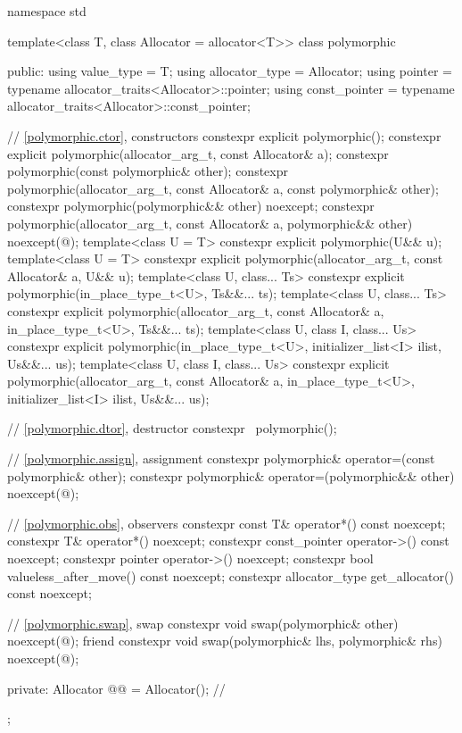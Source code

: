 %
\begin{codeblock}
namespace std {
  template<class T, class Allocator = allocator<T>>
  class polymorphic {
  public:
    using value_type = T;
    using allocator_type = Allocator;
    using pointer = typename allocator_traits<Allocator>::pointer;
    using const_pointer = typename allocator_traits<Allocator>::const_pointer;

    // \ref{polymorphic.ctor}, constructors
    constexpr explicit polymorphic();
    constexpr explicit polymorphic(allocator_arg_t, const Allocator& a);
    constexpr polymorphic(const polymorphic& other);
    constexpr polymorphic(allocator_arg_t, const Allocator& a, const polymorphic& other);
    constexpr polymorphic(polymorphic&& other) noexcept;
    constexpr polymorphic(allocator_arg_t, const Allocator& a, polymorphic&& other)
      noexcept(@\seebelow@);
    template<class U = T>
      constexpr explicit polymorphic(U&& u);
    template<class U = T>
      constexpr explicit polymorphic(allocator_arg_t, const Allocator& a, U&& u);
    template<class U, class... Ts>
      constexpr explicit polymorphic(in_place_type_t<U>, Ts&&... ts);
    template<class U, class... Ts>
      constexpr explicit polymorphic(allocator_arg_t, const Allocator& a,
                                     in_place_type_t<U>, Ts&&... ts);
    template<class U, class I, class... Us>
      constexpr explicit polymorphic(in_place_type_t<U>, initializer_list<I> ilist, Us&&... us);
    template<class U, class I, class... Us>
      constexpr explicit polymorphic(allocator_arg_t, const Allocator& a,
                                     in_place_type_t<U>, initializer_list<I> ilist, Us&&... us);

    // \ref{polymorphic.dtor}, destructor
    constexpr ~polymorphic();

    // \ref{polymorphic.assign}, assignment
    constexpr polymorphic& operator=(const polymorphic& other);
    constexpr polymorphic& operator=(polymorphic&& other) noexcept(@\seebelow@);

    // \ref{polymorphic.obs}, observers
    constexpr const T& operator*() const noexcept;
    constexpr T& operator*() noexcept;
    constexpr const_pointer operator->() const noexcept;
    constexpr pointer operator->() noexcept;
    constexpr bool valueless_after_move() const noexcept;
    constexpr allocator_type get_allocator() const noexcept;

    // \ref{polymorphic.swap}, swap
    constexpr void swap(polymorphic& other) noexcept(@\seebelow@);
    friend constexpr void swap(polymorphic& lhs, polymorphic& rhs) noexcept(@\seebelow@);

  private:
    Allocator @@ = Allocator();      // \expos
  };
}
\end{codeblock}

